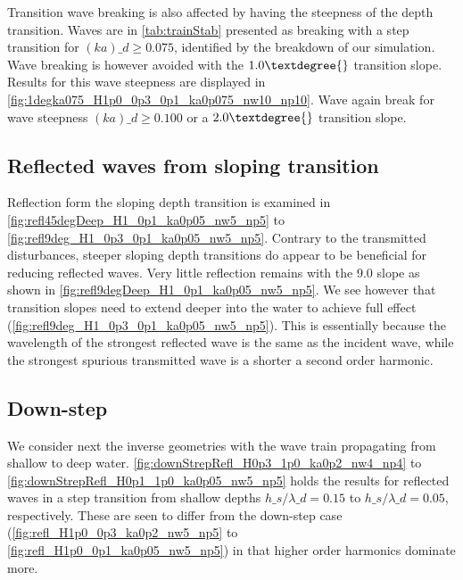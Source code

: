 Transition wave breaking is also affected by having the steepness of the depth transition. 
Waves are in \autoref{tab:trainStab} presented as breaking with a step transition for $(ka)\_d \geq 0.075$, identified by the breakdown of our simulation. 
Wave breaking is however avoided with the $1.0\textdegree{}$ transition slope. Results for this wave steepness are displayed in \autoref{fig:1degka075_H1p0_0p3_0p1_ka0p075_nw10_np10}.
Wave again break for wave steepness $(ka)\_d \geq 0.100$ or a $2.0\textdegree{}$ transition slope.




\subsection{Reflected waves from sloping transition}
Reflection form the sloping depth transition is examined in \autoref{fig:refl45degDeep_H1_0p1_ka0p05_nw5_np5} to \ref{fig:refl9deg_H1_0p3_0p1_ka0p05_nw5_np5}. 
Contrary to the transmitted disturbances, steeper sloping depth transitions do appear to be beneficial for reducing reflected waves. Very little reflection remains with the 9.0\textdegree{} slope as shown in \autoref{fig:refl9degDeep_H1_0p1_ka0p05_nw5_np5}. We see however that transition slopes need to extend deeper into the water to achieve full effect (\autoref{fig:refl9deg_H1_0p3_0p1_ka0p05_nw5_np5}).
This is essentially because the wavelength of the strongest reflected wave is the same as the incident wave, while the strongest spurious transmitted wave is a shorter a second order harmonic.




\subsection{Down-step}
We consider next the inverse geometries with the wave train propagating from shallow to deep water. 
\autoref{fig:downStrepRefl_H0p3_1p0_ka0p2_nw4_np4} to \ref{fig:downStrepRefl_H0p1_1p0_ka0p05_nw5_np5}
holds the results for reflected waves in a step transition from shallow depths $h\_s/\lambda\_d =0.15$ to $h\_s/\lambda\_d =0.05$, respectively.
These are seen to differ from the down-step case (\autoref{fig:refl_H1p0_0p3_ka0p2_nw5_np5} to \ref{fig:refl_H1p0_0p1_ka0p05_nw5_np5}) in that higher order harmonics dominate more.

